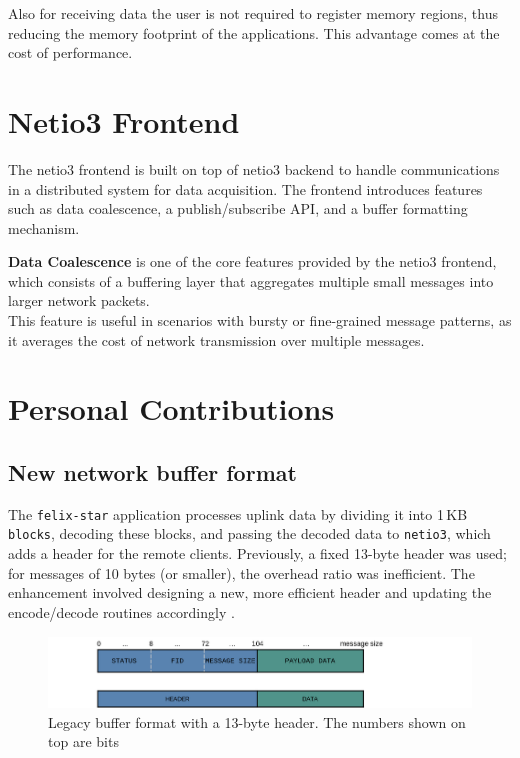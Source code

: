 Also for receiving data the user is not required to register memory regions, thus reducing the memory footprint of the applications. This advantage comes at the cost of performance.\\

\section{Netio3 Frontend}

The netio3 frontend is built on top of netio3 backend to handle communications in a distributed system for data acquisition. The frontend introduces features such as data coalescence, a publish/subscribe \acs{API}, and a buffer formatting mechanism.

\textbf{Data Coalescence} is one of the core features provided by the netio3 frontend, which consists of a buffering layer that aggregates multiple small messages into larger network packets.\\
This feature is useful in scenarios with bursty or fine-grained message patterns, as it averages the cost of network transmission over multiple messages.


\section{Personal Contributions}

\subsection{New network buffer format}

The \texttt{felix-star} application processes uplink data by dividing it into 1\,KB \texttt{blocks}, decoding these blocks, and passing the decoded data to \texttt{netio3}, which adds a header for the remote clients. 
Previously, a fixed 13-byte header was used; for messages of 10 bytes (or smaller), the overhead ratio was inefficient.
The enhancement involved designing a new, more efficient header and updating the encode/decode routines accordingly \cite{netio3-header-commit}.\\

\begin{figure}[htbp]
\centering
\includegraphics[width=\textwidth]{images/contributions/old-buffer-format.png}
\caption[Legacy format of network buffer]{Legacy buffer format with a 13-byte header. The numbers shown on top are bits}
\label{fig:old-buffer-format}
\end{figure}

